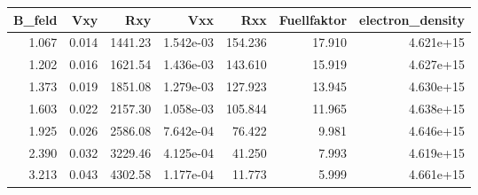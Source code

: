 \begin{tabular}{rrrrrrr}
\toprule
 B\_feld &    Vxy &      Rxy &        Vxx &      Rxx &  Fuellfaktor &  electron\_density \\
\midrule
  1.067 &  0.014 &  1441.23 &  1.542e-03 &  154.236 &       17.910 &         4.621e+15 \\
  1.202 &  0.016 &  1621.54 &  1.436e-03 &  143.610 &       15.919 &         4.627e+15 \\
  1.373 &  0.019 &  1851.08 &  1.279e-03 &  127.923 &       13.945 &         4.630e+15 \\
  1.603 &  0.022 &  2157.30 &  1.058e-03 &  105.844 &       11.965 &         4.638e+15 \\
  1.925 &  0.026 &  2586.08 &  7.642e-04 &   76.422 &        9.981 &         4.646e+15 \\
  2.390 &  0.032 &  3229.46 &  4.125e-04 &   41.250 &        7.993 &         4.619e+15 \\
  3.213 &  0.043 &  4302.58 &  1.177e-04 &   11.773 &        5.999 &         4.661e+15 \\
\bottomrule
\end{tabular}

